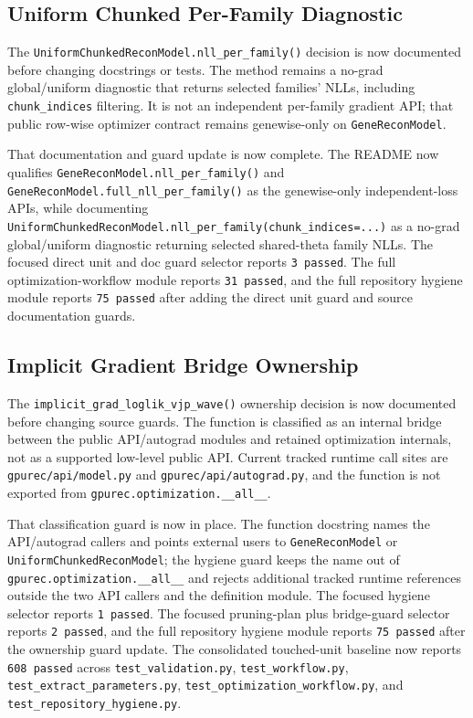\documentclass[11pt]{article}
\begin{document}
\subsection{Uniform Chunked Per-Family Diagnostic}

The \texttt{UniformChunkedReconModel.nll\_per\_family()} decision is now
documented before changing docstrings or tests.  The method remains a no-grad
global/uniform diagnostic that returns selected families' NLLs, including
\texttt{chunk\_indices} filtering.  It is not an independent per-family
gradient API; that public row-wise optimizer contract remains genewise-only on
\texttt{GeneReconModel}.

That documentation and guard update is now complete.  The README now qualifies
\texttt{GeneReconModel.nll\_per\_family()} and
\texttt{GeneReconModel.full\_nll\_per\_family()} as the genewise-only
independent-loss APIs, while documenting
\texttt{UniformChunkedReconModel.nll\_per\_family(chunk\_indices=...)} as a
no-grad global/uniform diagnostic returning selected shared-theta family NLLs.
The focused direct unit and doc guard selector reports \texttt{3 passed}.
The full optimization-workflow module reports \texttt{31 passed}, and the full
repository hygiene module reports \texttt{75 passed} after adding the direct
unit guard and source documentation guards.

\subsection{Implicit Gradient Bridge Ownership}

The \texttt{implicit\_grad\_loglik\_vjp\_wave()} ownership decision is now
documented before changing source guards.  The function is classified as an
internal bridge between the public API/autograd modules and retained
optimization internals, not as a supported low-level public API.  Current
tracked runtime call sites are \texttt{gpurec/api/model.py} and
\texttt{gpurec/api/autograd.py}, and the function is not exported from
\texttt{gpurec.optimization.\_\_all\_\_}.

That classification guard is now in place.  The function docstring names the
API/autograd callers and points external users to \texttt{GeneReconModel} or
\texttt{UniformChunkedReconModel}; the hygiene guard keeps the name out of
\texttt{gpurec.optimization.\_\_all\_\_} and rejects additional tracked runtime
references outside the two API callers and the definition module.  The focused
hygiene selector reports \texttt{1 passed}.
The focused pruning-plan plus bridge-guard selector reports \texttt{2 passed},
and the full repository hygiene module reports \texttt{75 passed} after the
ownership guard update.
The consolidated touched-unit baseline now reports \texttt{608 passed} across
\texttt{test\_validation.py}, \texttt{test\_workflow.py},
\texttt{test\_extract\_parameters.py}, \texttt{test\_optimization\_workflow.py},
and \texttt{test\_repository\_hygiene.py}.
\end{document}
